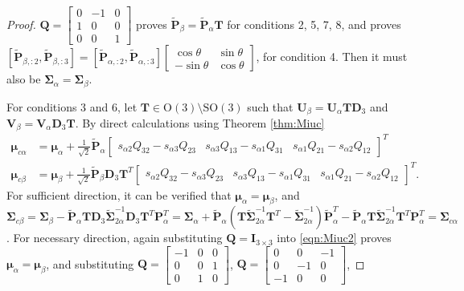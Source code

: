 \documentclass[12pt]{article}
\begin{document}
\begin{proof}
	$\mathbf{Q}=\begin{bmatrix}0&-1&0\\1&0&0\\0&0&1\end{bmatrix}$ proves $\tilde{\mathbf{P}}_\beta=\tilde{\mathbf{P}}_\alpha\mathbf{T}$ for conditions 2, 5, 7, 8, and proves $[\tilde{\mathbf{P}}_{\beta, :2}, \tilde{\mathbf{P}}_{\beta, :3}] = [\tilde{\mathbf{P}}_{\alpha, :2}, \tilde{\mathbf{P}}_{\alpha, :3}]\begin{bmatrix}\cos\theta&\sin\theta\\-\sin\theta&\cos\theta\end{bmatrix}$, for condition 4.
	Then it must also be $\mathbf{\Sigma}_\alpha=\mathbf{\Sigma}_\beta$.
	
	For conditions 3 and 6, let $\mathbf{T}\in\mathrm{O}(3)\setminus\mathrm{SO}(3)$ such that $\mathbf{U}_\beta=\mathbf{U}_\alpha\mathbf{T}\mathbf{D}_3$ and $\mathbf{V}_\beta=\mathbf{V}_\alpha\mathbf{D}_3\mathbf{T}$.
	By direct calculations using Theorem \ref{thm:Miuc}
	\begin{align}
		\label{eqn:Miuc2}
		\bm{\mu}_{c\alpha} &= \bm{\mu}_\alpha + \frac{1}{\sqrt{2}}\tilde{\mathbf{P}}_\alpha\begin{bmatrix}
			s_{\alpha 2}Q_{32}-s_{\alpha 3}Q_{23} & s_{\alpha 3}Q_{13}-s_{\alpha 1}Q_{31} & s_{\alpha 1}Q_{21}-s_{\alpha 2}Q_{12}
		\end{bmatrix}^T \nonumber \\
		\bm{\mu}_{c\beta} &= \bm{\mu}_\beta + \frac{1}{\sqrt{2}}\tilde{\mathbf{P}}_\beta\mathbf{D}_3\mathbf{T}^T\begin{bmatrix}
			s_{\alpha 2}Q_{32}-s_{\alpha 3}Q_{23} & s_{\alpha 3}Q_{13}-s_{\alpha 1}Q_{31} & s_{\alpha 1}Q_{21}-s_{\alpha 2}Q_{12}
		\end{bmatrix}^T.
	\end{align}
	For sufficient direction, it can be verified that $\bm{\mu}_\alpha=\bm{\mu}_\beta$, and $\mathbf{\Sigma}_{c\beta} = \mathbf{\Sigma}_\beta-\tilde{\mathbf{P}}_\alpha\mathbf{T}\mathbf{D}_3\tilde{\mathbf{\Sigma}}_{2\alpha}^{-1}\mathbf{D}_3\mathbf{T}^T\mathbf{P}_\alpha^T = \mathbf{\Sigma}_\alpha+\tilde{\mathbf{P}}_\alpha\left(\mathbf{T}\tilde{\mathbf{\Sigma}}_{2\alpha}^{-1}\mathbf{T}^T-\tilde{\mathbf{\Sigma}}_{2\alpha}^{-1}\right)\tilde{\mathbf{P}}_\alpha^T-\tilde{\mathbf{P}}_\alpha\mathbf{T}\tilde{\mathbf{\Sigma}}_{2\alpha}^{-1}\mathbf{T}^T\mathbf{P}_\alpha^T = \mathbf{\Sigma}_{c\alpha}$.
	For necessary direction, again substituting $\mathbf{Q}=\mathbf{I}_{3\times 3}$ into \eqref{eqn:Miuc2} proves $\bm{\mu}_\alpha=\bm{\mu}_\beta$, and substituting $\mathbf{Q}=\begin{bmatrix}-1&0&0\\0&0&1\\0&1&0\end{bmatrix}$, $\mathbf{Q}=\begin{bmatrix}0&0&-1\\0&-1&0\\-1&0&0\end{bmatrix}$,

\end{proof}
\end{document}

